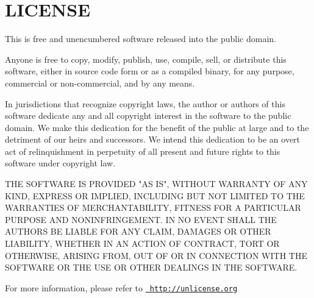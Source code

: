 \chapter{LICENSE}
\hypertarget{md__c_1_2_git_2_numerosity_2server_2_l_i_c_e_n_s_e}{}\label{md__c_1_2_git_2_numerosity_2server_2_l_i_c_e_n_s_e}
This is free and unencumbered software released into the public domain.

Anyone is free to copy, modify, publish, use, compile, sell, or distribute this software, either in source code form or as a compiled binary, for any purpose, commercial or non-\/commercial, and by any means.

In jurisdictions that recognize copyright laws, the author or authors of this software dedicate any and all copyright interest in the software to the public domain. We make this dedication for the benefit of the public at large and to the detriment of our heirs and successors. We intend this dedication to be an overt act of relinquishment in perpetuity of all present and future rights to this software under copyright law.

THE SOFTWARE IS PROVIDED "{}\+AS IS"{}, WITHOUT WARRANTY OF ANY KIND, EXPRESS OR IMPLIED, INCLUDING BUT NOT LIMITED TO THE WARRANTIES OF MERCHANTABILITY, FITNESS FOR A PARTICULAR PURPOSE AND NONINFRINGEMENT. IN NO EVENT SHALL THE AUTHORS BE LIABLE FOR ANY CLAIM, DAMAGES OR OTHER LIABILITY, WHETHER IN AN ACTION OF CONTRACT, TORT OR OTHERWISE, ARISING FROM, OUT OF OR IN CONNECTION WITH THE SOFTWARE OR THE USE OR OTHER DEALINGS IN THE SOFTWARE.

For more information, please refer to \href{http://unlicense.org}{\texttt{ http\+://unlicense.\+org}} 